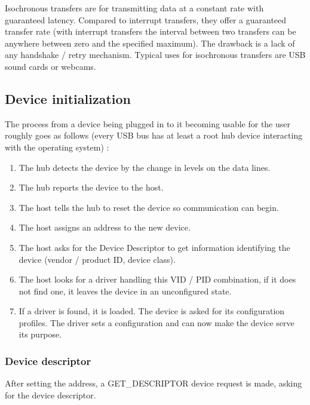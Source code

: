 \documentclass{article}
\begin{document}
Isochronous transfers are for transmitting data at a constant rate with guaranteed
latency. Compared to interrupt transfers, they offer a guaranteed transfer rate
(with interrupt transfers the interval between two transfers can be anywhere
between zero and the specified maximum). The drawback is a lack of any handshake
/ retry mechanism.
Typical uses for isochronous transfers are USB sound cards or webcams.
\cite[p. 44ff.]{usbstd}

\subsection{Device initialization}
\label{devinit}

The process from a device being plugged in to it becoming usable for the user
roughly goes as follows (every USB bus has at least a root hub device interacting with
the operating system) \cite[p. 87ff.]{uc}:

\begin{enumerate}
  \item The hub detects the device by the change in levels on the data lines.
  \item The hub reports the device to the host.
  \item The host tells the hub to reset the device so communication can begin.
  \item The host assigns an address to the new device.
  \item The host asks for the Device Descriptor to get information identifying the device
        (vendor / product ID, device class).
  \item The host looks for a driver handling this VID / PID combination, if it does not find one,
        it leaves the device in an unconfigured state.
  \item If a driver is found, it is loaded. The device is asked for its configuration profiles.
        The driver sets a configuration and can now make the device serve its purpose.
\end{enumerate}

\subsubsection{Device descriptor}

After setting the address, a GET\_DESCRIPTOR
device request is made, asking for the device descriptor.
\end{document}

